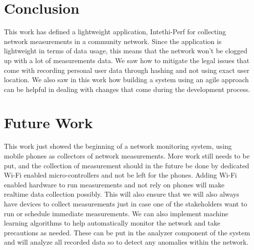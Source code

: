\section{Conclusion}\label  {sec:conclusion}
This work has defined a lightweight application, Intethi-Perf for collecting network measurements in a community network.
Since the application is lightweight in terms of data usage, this means that the network won't be clogged up with a lot of measurements data.
We saw how to mitigate the legal issues that come with recording personal user data through hashing and not using exact user location.
We also saw in this work how building a system using an agile approach can be helpful in dealing with changes that come during the development process.

\section{Future Work}\label{sec:future-work}
This work just showed the beginning of a network monitoring system, using mobile phones as collectors of network measurements.
More work still needs to be put, and the collection of measurement should in the future be done by dedicated Wi-Fi enabled micro-controllers and not be left for the phones.
Adding Wi-Fi enabled hardware to run measurements and not rely on phones will make realtime data collection possibly.
This will also ensure that we will also always have devices to collect measurements just in case one of the stakeholders want to run or schedule immediate measurements.
We can also implement machine learning algorithms to help automatically monitor the network and take precautions as needed.
These can be put in the analyzer component of the system and will analyze all recorded data so to detect any anomalies within the network.

